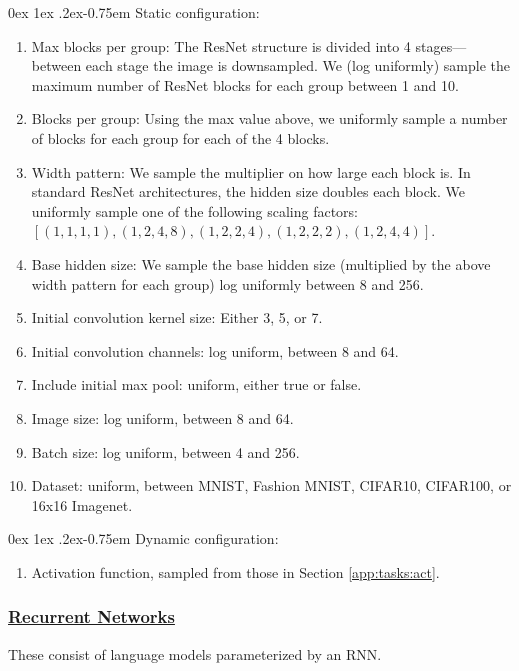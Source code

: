 \documentclass[11pt]{article}
\makeatletter
\renewcommand{\paragraph}{%
  \@startsection{paragraph}{4}%
  {\z@}{0ex \@plus 1ex \@minus .2ex}{-0.75em}%
  {\normalfont\normalsize\bfseries}%
}
\makeatother
\begin{document}
\paragraph{Static configuration:}
\begin{enumerate}
    \item Max blocks per group: The ResNet structure is divided into 4 stages---between each stage the image is downsampled. We (log uniformly) sample the maximum number of ResNet blocks for each group between 1 and 10.
    \item Blocks per group: Using the max value above, we uniformly sample a number of blocks for each group for each of the 4 blocks.
    \item Width pattern: We sample the multiplier on how large each block is. In standard ResNet architectures, the hidden size doubles each block. We uniformly sample one of the following scaling factors: $[(1, 1, 1, 1), (1, 2, 4, 8), (1, 2, 2, 4), (1, 2, 2, 2), (1, 2, 4, 4)]$.
    \item Base hidden size: We sample the base hidden size (multiplied by the above width pattern for each group) log uniformly between 8 and 256.
    \item Initial convolution kernel size: Either 3, 5, or 7.
    \item Initial convolution channels: log uniform, between 8 and 64.
    \item Include initial max pool: uniform, either true or false.
    \item Image size: log uniform, between 8 and 64.
    \item Batch size: log uniform, between 4 and 256.
    \item Dataset: uniform, between MNIST, Fashion MNIST, CIFAR10, CIFAR100, or 16x16 Imagenet.
\end{enumerate}


\paragraph{Dynamic configuration:}
\begin{enumerate}
    \item Activation function, sampled from those in Section \ref{app:tasks:act}.
\end{enumerate}

\subsubsection{\href{https://github.com/google/learned_optimization/blob/4447601601f04e3dc7b1aecd7854d44526593752/learned_optimization/tasks/parametric/lm_rnn.py}{Recurrent Networks}}
These consist of language models parameterized by an RNN. 
\end{document}
